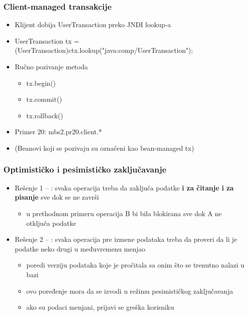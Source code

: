 \documentclass[compress]{beamer}
\begin{document}
\begin{frame}
  \frametitle{Client-managed transakcije}
  \begin{itemize}
    \item Klijent dobija UserTransaction preko JNDI lookup-a
    \item UserTransaction tx = (UserTransaction)ctx.lookup("java:comp/UserTransaction");
    \item Ručno pozivanje metoda
    \begin{itemize}
      \item tx.begin()
      \item tx.commit()
      \item tx.rollback()
    \end{itemize}
    \item Primer 20: mbs2.pr20.client.*
    \item (Beanovi koji se pozivaju su označeni kao bean-managed tx)
  \end{itemize}
\end{frame}
\begin{frame}
  \frametitle{Optimističko i pesimističko zaključavanje}
  \begin{itemize}
    \item Rešenje 1 -- : svaka operacija treba da zaključa podatke \textbf{i za čitanje i za pisanje} sve dok se ne završi
    \begin{itemize}
      \item u prethodnom primeru operacija B bi bila blokirana sve dok A ne otključa podatke
    \end{itemize}
    \item Rešenje 2 -- : svaka operacija pre izmene podataka treba da proveri da li je podatke neko drugi u međuvremenu menjao
    \begin{itemize}
      \item poredi verziju podataka koje je pročitala sa onim što se trenutno nalazi u bazi
      \item ovo poređenje mora da se izvodi u režimu pesimističkog zaključavanja
      \item ako su podaci menjani, prijavi se greška korisniku
    \end{itemize}
  \end{itemize}
\end{frame}
\end{document}
